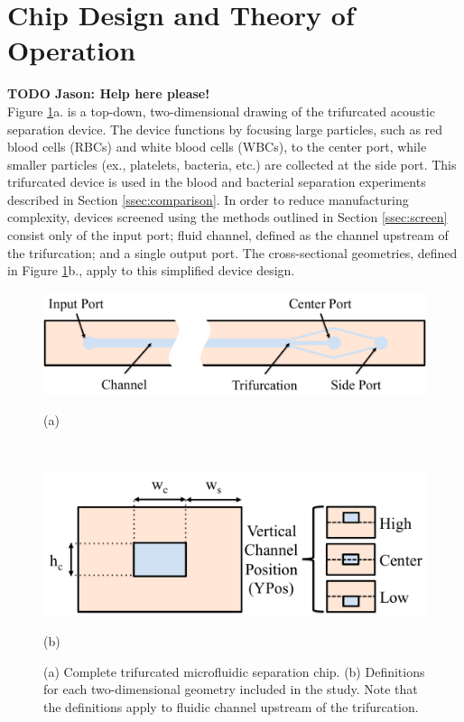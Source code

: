 \section{Chip Design and Theory of Operation}
\label{sec:chipDesign}

\textbf{TODO Jason: Help here please!}\\

Figure \ref{fig:geometry}a. is a top-down, two-dimensional drawing of the trifurcated acoustic separation device. The device functions by focusing large particles, such as red blood cells (RBCs) and white blood cells (WBCs), to the center port, while smaller particles (ex., platelets, bacteria, etc.) are collected at the side port. This trifurcated device is used in the blood and bacterial separation experiments described in Section \ref{ssec:comparison}. In order to reduce manufacturing complexity, devices screened using the methods outlined in Section \ref{ssec:screen} consist only of the input port; fluid channel, defined as the channel upstream of the trifurcation; and a single output port. The cross-sectional geometries, defined in Figure \ref{fig:geometry}b., apply to this simplified device design. 

\begin{figure}[htb]
  \begin{minipage}[t]{0.99\linewidth}\centering
    \includegraphics[width=14cm]{chip}
    \medskip
    \centerline{(a)}
  \end{minipage}\hfill\\
  \begin{minipage}[t]{0.99\linewidth}\centering
    \includegraphics[width=14cm]{2D}
    \medskip
    \centerline{(b)}
  \end{minipage}
  \caption[Acoustofluidic separation device and 2D geometric definitions]{(a) Complete trifurcated microfluidic separation chip. (b) Definitions for each two-dimensional geometry included in the study. Note that the definitions apply to fluidic channel upstream of the trifurcation.}
  \label{fig:geometry}
\end{figure}

